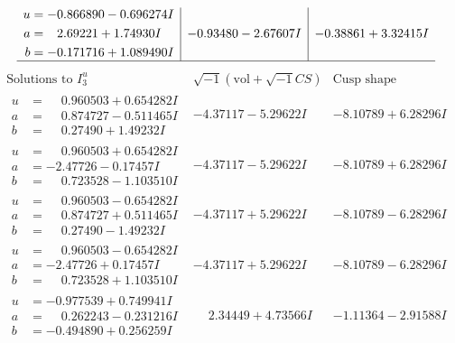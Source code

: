 \documentclass[1p]{elsarticle_modified}
\theoremstyle{definition}
\newcommand{\I}{\sqrt{-1}}
\begin{document}
$$\begin{array}{c|c|c}
\begin{aligned}
u &= -0.866890 - 0.696274 I \\
a &= \phantom{-}2.69221 + 1.74930 I \\
b &= -0.171716 + 1.089490 I\end{aligned}
 & -0.93480 - 2.67607 I & -0.38861 + 3.32415 I\\
 \hline 
 \end{array}$$\newpage$$\begin{array}{c|c|c}  
\text{Solutions to }I^u_{3}& \I (\text{vol} + \sqrt{-1}CS) & \text{Cusp shape}\\
 \hline 
\begin{aligned}
u &= \phantom{-}0.960503 + 0.654282 I \\
a &= \phantom{-}0.874727 - 0.511465 I \\
b &= \phantom{-}0.27490 + 1.49232 I\end{aligned}
 & -4.37117 - 5.29622 I & -8.10789 + 6.28296 I \\ \hline\begin{aligned}
u &= \phantom{-}0.960503 + 0.654282 I \\
a &= -2.47726 - 0.17457 I \\
b &= \phantom{-}0.723528 - 1.103510 I\end{aligned}
 & -4.37117 - 5.29622 I & -8.10789 + 6.28296 I \\ \hline\begin{aligned}
u &= \phantom{-}0.960503 - 0.654282 I \\
a &= \phantom{-}0.874727 + 0.511465 I \\
b &= \phantom{-}0.27490 - 1.49232 I\end{aligned}
 & -4.37117 + 5.29622 I & -8.10789 - 6.28296 I \\ \hline\begin{aligned}
u &= \phantom{-}0.960503 - 0.654282 I \\
a &= -2.47726 + 0.17457 I \\
b &= \phantom{-}0.723528 + 1.103510 I\end{aligned}
 & -4.37117 + 5.29622 I & -8.10789 - 6.28296 I \\ \hline\begin{aligned}
u &= -0.977539 + 0.749941 I \\
a &= \phantom{-}0.262243 - 0.231216 I \\
b &= -0.494890 + 0.256259 I\end{aligned}
 & \phantom{-}2.34449 + 4.73566 I & -1.11364 - 2.91588 I \\ \hline\begin{aligned}

\end{aligned}
\end{array}$$
\end{document}
